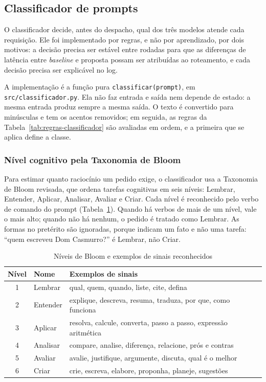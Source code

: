 \subsection{Classificador de prompts}

O classificador decide, antes do despacho, qual dos três modelos atende cada requisição. Ele foi implementado por regras, e não por aprendizado, por dois motivos: a decisão precisa ser estável entre rodadas para que as diferenças de latência entre \textit{baseline} e proposta possam ser atribuídas ao roteamento, e cada decisão precisa ser explicável no log.

A implementação é a função pura \texttt{classificar(prompt)}, em \texttt{src/classificador.py}. Ela não faz entrada e saída nem depende de estado: a mesma entrada produz sempre a mesma saída. O texto é convertido para minúsculas e tem os acentos removidos; em seguida, as regras da Tabela~\ref{tab:regras-classificador} são avaliadas em ordem, e a primeira que se aplica define a classe.

\subsubsection{Nível cognitivo pela Taxonomia de Bloom}

Para estimar quanto raciocínio um pedido exige, o classificador usa a Taxonomia de Bloom revisada, que ordena tarefas cognitivas em seis níveis: Lembrar, Entender, Aplicar, Analisar, Avaliar e Criar. Cada nível é reconhecido pelo verbo de comando do prompt (Tabela~\ref{tab:bloom}). Quando há verbos de mais de um nível, vale o mais alto; quando não há nenhum, o pedido é tratado como Lembrar. As formas no pretérito são ignoradas, porque indicam um fato e não uma tarefa: ``quem escreveu Dom Casmurro?'' é Lembrar, não Criar.

\begin{table}[ht]
\centering
\caption{Níveis de Bloom e exemplos de sinais reconhecidos}
\label{tab:bloom}
\begin{tabular}{cll}
\hline
\textbf{Nível} & \textbf{Nome} & \textbf{Exemplos de sinais} \\ \hline
1 & Lembrar & qual, quem, quando, liste, cite, defina \\
2 & Entender & explique, descreva, resuma, traduza, por que, como funciona \\
3 & Aplicar & resolva, calcule, converta, passo a passo, expressão aritmética \\
4 & Analisar & compare, analise, diferença, relacione, prós e contras \\
5 & Avaliar & avalie, justifique, argumente, discuta, qual é o melhor \\
6 & Criar & crie, escreva, elabore, proponha, planeje, sugestões \\ \hline
\end{tabular}
\end{table}

